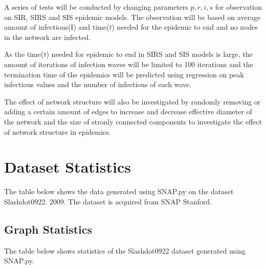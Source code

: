\documentclass{subfiles}
\begin{document}
  A series of tests will be conducted by changing parameters \(p, r, i, s\) for observation on SIR, SIRS and SIS epidemic models. The observation will be based on average amount of infectious(I) and time(\(t\)) needed for the epidemic to end and no nodes in the network are infected.

  As the time(\(t\)) needed for epidemic to end in SIRS and SIS models is large, the amount of iterations of infection waves will be limited to 100 iterations and the termination time of the epidemics will be predicted using regression on peak infectious values and the number of infectious of each wave.

  The effect of network structure will also be investigated by randomly removing or adding a certain amount of edges to increase and decrease effective diameter of the network and the size of stronly connected components to investigate the effect of network structure in epidemics.

  \section{Dataset Statistics}
  The table below shows the data generated using SNAP.py on the dataset Slashdot0922. 2009\cite{leskovec2008community, snapnets}. The dataset is acquired from SNAP Stanford\cite{snapnets}.
  \subsection{Graph Statistics}
  The table below shows statistics of the Slashdot0922 dataset\cite{snapnets} generated using SNAP.py\cite{leskovec2016snap}.
\end{document}
